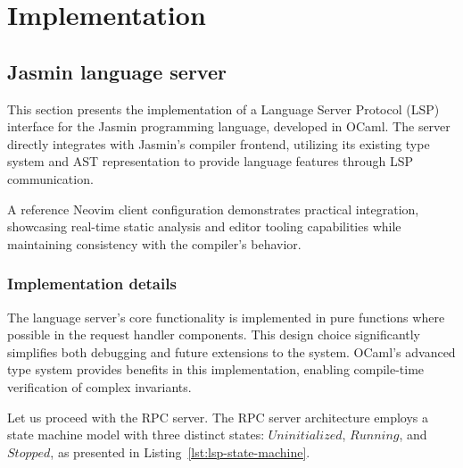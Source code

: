 \chapter{Implementation}
\label{chap:impl}

\section{Jasmin language server}

This section presents the implementation of a Language Server Protocol (LSP)
interface for the Jasmin programming language, developed in OCaml. The server
directly integrates with Jasmin's compiler frontend, utilizing its existing type
system and AST representation to provide language features through LSP
communication. 

A reference Neovim client configuration demonstrates practical integration,
showcasing real-time static analysis and editor tooling capabilities while
maintaining consistency with the compiler's behavior. 

\subsection{Implementation details}
\label{impl:implementation-details}

The language server's core functionality is implemented in pure functions where
possible in the request handler components. This design choice significantly
simplifies both debugging and future extensions to the system. OCaml's advanced
type system provides benefits in this implementation, enabling compile-time
verification of complex invariants.

Let us proceed with the RPC server. The RPC server architecture employs a state
machine model with three distinct states: $Uninitialized$, $Running$, and
$Stopped$, as presented in Listing~\ref{lst:lsp-state-machine}. 

